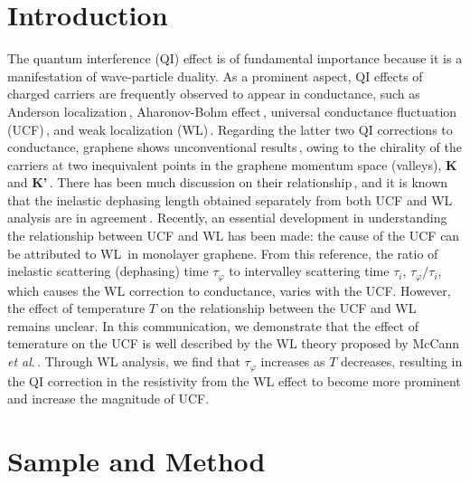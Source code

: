 \documentclass[final,5p,times,twocolumn]{elsarticle}
\begin{document}
\section{Introduction}

The quantum interference (QI) effect is of fundamental importance because it is a manifestation of wave-particle duality.
As a prominent aspect, QI effects of charged carriers are frequently observed to appear in conductance, such as Anderson localization\,\cite{Anderson}, Aharonov-Bohm effect\,\cite{ABeffect}, universal conductance fluctuation (UCF)\,\cite{LeeStone,LeeStoneFukuyama}, and weak localization (WL)\,\cite{Hikami,Bergmann}. 
Regarding the latter two QI corrections to conductance, graphene shows unconventional results\,\cite{Tikhonenko,Tikhonenko2,Ojeda-Aristizabal,Bohra}, owing to the chirality of the carriers at two inequivalent points in the graphene momentum space (valleys),  {\bf K} and {\bf K'}\,\cite{SuzuuraAndo,McCann}.
There has been much discussion on their relationship\,\cite{Horsell,KechedzhiUCF,Chuang}, and it is known that the inelastic dephasing length obtained separately from both UCF and WL analysis are in agreement\,\cite{Westervelt1,Westervelt2,YungFuChen}.
Recently, an essential development in understanding the relationship between UCF and WL has been made:
the cause of the UCF can be attributed to WL\,\cite{GrWL} in monolayer graphene.
From this reference, the ratio of inelastic scattering (dephasing) time $\tau_\varphi$ to intervalley scattering time $\tau_i$, $\tau_\varphi/\tau_i$, which causes the WL correction to conductance, varies with the UCF.
However, the effect of temperature $T$ on the relationship between the UCF and WL remains unclear.
In this communication, we demonstrate that the effect of temerature on the UCF is well described by the WL theory proposed by McCann {\it et al}.\,\cite{McCann}.
Through WL analysis, we find that $\tau_\varphi$ increases as $T$ decreases, resulting in the QI correction in the resistivity from the WL effect to become more prominent and increase the magnitude of UCF.


\section{Sample and Method}
\end{document}
